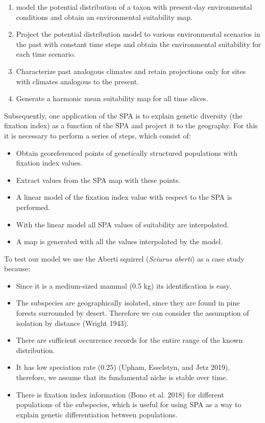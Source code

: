 \documentclass[
]{article}
\providecommand{\tightlist}{%
  \setlength{\itemsep}{0pt}\setlength{\parskip}{0pt}}
\begin{document}
\begin{enumerate}
\def\labelenumi{\arabic{enumi}.}
\tightlist
\item
  model the potential distribution of a taxon with present-day
  environmental conditions and obtain an environmental suitability map.
\item
  Project the potential distribution model to various environmental
  scenarios in the past with constant time steps and obtain the
  environmental suitability for each time scenario.
\item
  Characterize past analogous climates and retain projections only for
  sites with climates analogous to the present.
\item
  Generate a harmonic mean suitability map for all time slices.
\end{enumerate}

Subsequently, one application of the SPA is to explain genetic diversity
(the fixation index) as a function of the SPA and project it to the
geography. For this it is necessary to perform a series of steps, which
consist of:

\begin{itemize}
\tightlist
\item
  Obtain georeferenced points of genetically structured populations with
  fixation index values.
\item
  Extract values from the SPA map with these points.
\item
  A linear model of the fixation index value with respect to the SPA is
  performed.
\item
  With the linear model all SPA values of suitability are interpolated.
\item
  A map is generated with all the values interpolated by the model.
\end{itemize}

To test our model we use the Aberti squirrel (\emph{Sciurus aberti}) as
a case study because:

\begin{itemize}
\tightlist
\item
  Since it is a medium-sized mammal (0.5 kg) its identification is easy.
\item
  The subspecies are geographically isolated, since they are found in
  pine forests surrounded by desert. Therefore we can consider the
  assumption of isolation by distance (Wright 1943).
\item
  There are sufficient occurrence records for the entire range of the
  known distribution.
\item
  It has low speciation rate (0.25) (Upham, Esselstyn, and Jetz 2019),
  therefore, we assume that its fundamental niche is stable over time.
\item
  There is fixation index information (Bono et al. 2018) for different
  populations of the subspecies, which is useful for using SPA as a way
  to explain genetic differentiation between populations.
\end{itemize}
\end{document}
